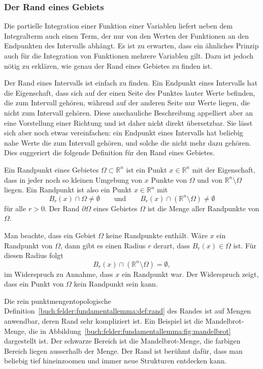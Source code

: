 %
%
\subsubsection{Der Rand eines Gebiets}
Die partielle Integration einer Funktion einer Variablen liefert
neben dem Integralterm auch einen Term, der nur von den Werten der
Funktionen an den Endpunkten des Intervalls abhängt.
Es ist zu erwarten, dass ein ähnliches Prinzip auch für die
Integration von Funktionen mehrere Variablen gilt.
Dazu ist jedoch nötig zu erklären, wie genau der Rand eines
Gebietes zu finden ist.

Der Rand eines Intervalls ist einfach zu finden.
Ein Endpunkt eines Intervalls hat die Eigenschaft, dass sich
auf der einen Seite des Punktes lauter Werte befinden, die zum
Intervall gehören, während auf der anderen Seite nur Werte liegen,
die nicht zum Intervall gehören.
Diese anschauliche Beschreibung appelliert aber an eine Vorstellung
einer Richtung und ist daher nicht direkt übersetzbar.
Sie lässt sich aber noch etwas vereinfachen: ein Endpunkt eines
Intervalls hat beliebig nahe Werte die zum Intervall gehören, und
solche die nicht mehr dazu gehören.
Dies suggeriert die folgende Definition für den Rand eines Gebietes.

\begin{definition}[Rand]
\label{buch:felder:fundamentallemma:def:rand}
Ein Randpunkt eines Gebietes $\Omega\subset\mathbb{R}^n$ ist ein Punkt
$x\in\mathbb{R}^n$ mit der Eigenschaft, dass in jeder noch so kleinen 
Umgebung von $x$ Punkte von $\Omega$ und von $\mathbb{R}^n\setminus\Omega$
liegen.
Ein Randpunkt ist also ein Punkt $x\in\mathbb{R}^n$ mit
\[
B_r(x)\cap \Omega\ne \emptyset
\qquad\text{und}\qquad
B_r(x)\cap (\mathbb{R}^n\setminus \Omega)
\ne \emptyset
\]
für alle $r>0$.
Der Rand $\partial \Omega$ eines Gebietes $\Omega$ ist die Menge
aller Randpunkte von $\Omega$.
\end{definition}

Man beachte, dass ein Gebiet $\Omega$ keine Randpunkte enthält.
Wäre $x$ ein Randpunkt von $\Omega$, dann gibt es einen Radius $r$
derart, dass $B_r(x)\in\Omega$ ist.
Für diesen Radius folgt
\[
B_r(x)\cap (\mathbb{R}^n\setminus\Omega)
=
\emptyset,
\]
im Widerspruch zu Annahme, dass $x$ ein Randpunkt war.
Der Widerspruch zeigt, dass ein Punkt von $\Omega$ kein Randpunkt
sein kann.

Die rein punktmengentopologische 
%
Definition~\ref{buch:felder:fundamentallemma:def:rand} des Randes ist
auf Mengen anwendbar, deren Rand sehr kompliziert ist.
Ein Beispiel ist die Mandelbrot-Menge, die in
Abbildung~\ref{buch:felder:fundamentallemma:fig:mandelbrot}
dargestellt ist.
Der schwarze Bereich ist die Mandelbrot-Menge, die farbigen Bereich
liegen ausserhalb der Menge.
Der Rand ist berühmt dafür, dass man beliebig tief hineinzoomen
und immer neue Strukturen entdecken kann.

